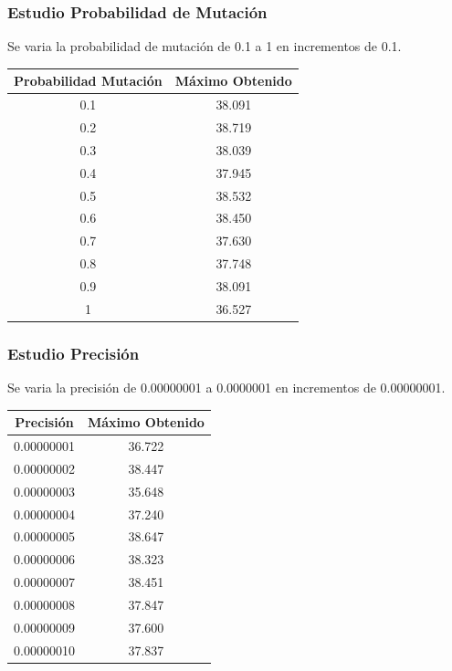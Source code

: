 \documentclass[12pt]{article}
\begin{document}
\subsubsection*{Estudio Probabilidad de Mutación}
	Se varia la probabilidad de mutación de 0.1 a 1 en incrementos de 0.1.
\begin{table}[H]
\begin{center}
\begin{tabular}{|cc|} \hline
Probabilidad Mutación & Máximo Obtenido \\  \hline
0.1 & 38.091 \\ 
0.2 & 38.719 \\ 
0.3 & 38.039 \\
0.4 & 37.945 \\
0.5 & 38.532 \\
0.6 & 38.450 \\
0.7 & 37.630 \\
0.8 & 37.748 \\ 
0.9 & 38.091 \\
1   & 36.527 \\  \hline
\end{tabular}
\end{center}
\end{table}
\subsubsection*{Estudio Precisión}
	Se varia la precisión de 0.00000001 a 0.0000001 en incrementos de 0.00000001.
\begin{table}[H]
\begin{center}
\begin{tabular}{|cc|} \hline
Precisión & Máximo Obtenido \\  \hline
0.00000001 & 36.722 \\ 
0.00000002 & 38.447 \\ 
0.00000003 & 35.648 \\
0.00000004 & 37.240 \\
0.00000005 & 38.647 \\
0.00000006 & 38.323 \\
0.00000007 & 38.451\\
0.00000008 & 37.847 \\ 
0.00000009 & 37.600 \\
0.00000010 & 37.837 \\  \hline
\end{tabular}
\end{center}
\end{table}
\end{document}
